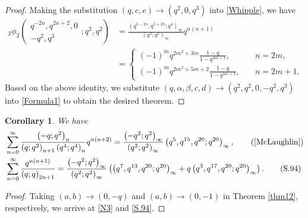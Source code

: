 \documentclass[reqno,12pt]{amsart}
\newtheorem{corollary}[theorem]{Corollary}
\theoremstyle{remark}
\numberwithin{equation}{section}
\begin{document}
\begin{proof}
Making the substitution $\left(q,c,e\right)\to\left(q^2,0,q^3\right)$ into \eqref{Whipple}, we have
\begin{align}
{_3\phi_2}\left(
\begin{array}{ccc}
q^{-2n},q^{2n+2},0\\
-q^2,q^3
\end{array};q^2,q^2\right)
&=
\frac{\left(q^{3-2n}, q^{5+2n};q^4\right)_{\infty}}
{\left(q^{3};q^2\right)_{\infty}}q^{n\left(n+1\right)}\nonumber\\
&
=\left\{\begin{array}{ll}
\left(-1\right)^mq^{2m^2+3m}\frac{1-q}{1-q^{4m+1}},&\quad {n=2m},\\
\left(-1\right)^{m}q^{2m^2+5m+2}\frac{1-q}{1-q^{4m+3}},&\quad{n=2m+1}.
\end{array}\right.\label{A19}
\end{align}
Based on the above identity,  we substitute $\left(q,\alpha,\beta,c,d\right)\to\left(q^2,q^2,0,-q^2,q^3\right)$ into \eqref{Formula1} to obtain the desired theorem.
\end{proof}
\begin{corollary}
We have
\begin{align}
&\sum_{n=0}^{\infty}\frac{\left(-q;q^2\right)_{n}}
{\left(q;q^2\right)_{n+1}\left(q^4;q^4\right)_n}q^{n\left(n+2\right)}
=\frac{\left(-q^2;q^2\right)_{\infty}
}
{\left(q^2;q^2\right)_{\infty}}\left(q^5,q^{15},q^{20};q^{20}\right)_{\infty},\tag{\cite[Eq (2.7)]{McLaughlin}}\label{N3}\\
&\sum_{n=0}^{\infty}\frac{q^{n\left(n+1\right)}}
{\left(q;q\right)_{2n+1}}
=\frac{\left(-q^2;q^2\right)_{\infty}
}
{\left(q^2;q^2\right)_{\infty}}\left(\left(q^7,q^{13},q^{20};q^{20}\right)_{\infty}
+q\left(q^3,q^{17},q^{20};q^{20}\right)_{\infty}\right).\tag{S.94}\label{S.94}
\end{align}
\end{corollary}
\begin{proof}
Taking $\left(a,b\right)\to\left(0,-q\right)$ and  $\left(a,b\right)\to\left(0,-1\right)$ in Theorem \ref{thm12}, respectively,  we arrive at \eqref{N3} and \eqref{S.94}.
\end{proof}
\end{document}
